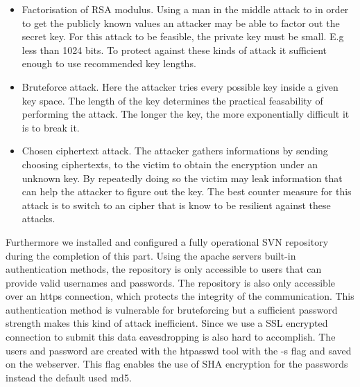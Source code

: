 \begin {itemize}

\item Factorisation of RSA modulus. Using a man in the middle attack to in order to get the publicly known values an attacker may be able to factor out the secret key. For this attack to be feasible, the private key must be small. E.g less than 1024 bits. To protect against these kinds of attack it sufficient enough to use recommended key lengths. \cite {nisc}  

\item Bruteforce attack. Here the attacker tries every possible key inside a given key space. The length of the key determines the practical feasability of performing the attack. The longer the key, the more exponentially difficult it is to break it. 

\item Chosen ciphertext attack. The attacker gathers informations by sending choosing ciphertexts, to the victim to obtain the encryption under an unknown key. By repeatedly doing so the victim may leak information that can help the attacker to figure out the key. The best counter measure for this attack is to switch to an cipher that is know to be resilient against these attacks. 
\end {itemize}


\noindent
Furthermore we installed and configured a fully operational SVN repository during the completion of this part.
Using the apache servers built-in authentication methods, the repository is only accessible to users that can provide valid usernames and passwords. The repository is also only accessible over an https connection, which protects the integrity of the communication. This authentication method is vulnerable for bruteforcing but a sufficient password strength makes this kind of attack inefficient. Since we use a SSL encrypted connection to submit this data eavesdropping is also hard to accomplish. The users and password are created with the htpasswd tool with the -s flag and saved on the webserver. This flag enables the use of SHA encryption for the passwords instead the default used md5.
\newline




